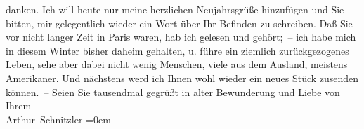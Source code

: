 \begin{ledgroupsized}[t]{13cm}
               danken. Ich will heute nur meine herzlichen Neujahrsgrüße hinzufügen und Sie bitten,
               mir gelegentlich wieder ein Wort über Ihr Befinden zu schreiben. Daß Sie vor nicht
               langer Zeit in Paris waren, hab ich gelesen und
               gehört; – ich habe mich in diesem Winter bisher daheim gehalten, u. {\pb}führe ein ziemlich zurückgezogenes Leben, sehe
               aber dabei nicht wenig Menschen, viele aus dem Ausland, meistens Amerikaner. Und nächstens werd ich Ihnen wohl wieder ein neues
               Stück zusenden können. –\pend
           \pstart
           Seien Sie tausendmal gegrüßt in alter Bewunderung und Liebe von Ihrem{\\[\baselineskip]}\spacefill\mbox{Arthur Schnitzler}\pend
           \leftskip=0em{}
         
         \endnumbering{}\end{ledgroupsized}  \newcommand{\dateiname}{L02407}\newcommand{\titel}{Arthur Schnitzler an Georg Brandes, 4. 1. 1924}\newcommand{\editorInnen}{Martin Anton Müller und Gerd-Hermann Susen}
      